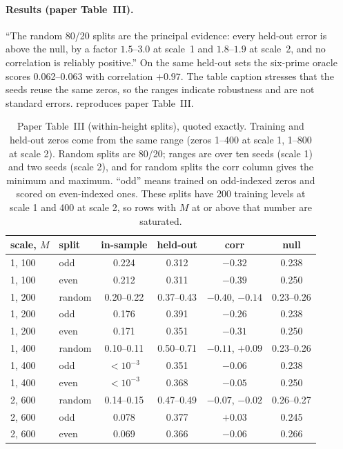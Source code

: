 \paragraph{Results (paper Table~III).} ``The random 80/20 splits are the principal evidence: every held-out error is above the null, by a factor $1.5$--$3.0$ at scale~1 and $1.8$--$1.9$ at scale~2, and no correlation is reliably positive.'' On the same held-out sets the six-prime oracle scores 0.062--0.063 with correlation $+0.97$. The table caption stresses that the seeds reuse the same zeros, so the ranges indicate robustness and are not standard errors.  reproduces paper Table~III.

\begin{table}[htbp]\centering
\caption{Paper Table~III (within-height splits), quoted exactly. Training and held-out zeros come from the same range (zeros 1--400 at scale 1, 1--800 at scale 2). Random splits are 80/20; ranges are over ten seeds (scale 1) and two seeds (scale 2), and for random splits the corr column gives the minimum and maximum. ``odd'' means trained on odd-indexed zeros and scored on even-indexed ones. These splits have 200 training levels at scale 1 and 400 at scale 2, so rows with $M$ at or above that number are saturated.}
\label{tab:paper-memorization-tableIII}
\footnotesize
\begin{tabular}{llcccc}
\toprule
scale, $M$ & split & in-sample & held-out & corr & null \\
\midrule
1, 100 & odd & 0.224 & 0.312 & $-0.32$ & 0.238 \\
1, 100 & even & 0.212 & 0.311 & $-0.39$ & 0.250 \\
1, 200 & random & 0.20--0.22 & 0.37--0.43 & $-0.40$, $-0.14$ & 0.23--0.26 \\
1, 200 & odd & 0.176 & 0.391 & $-0.26$ & 0.238 \\
1, 200 & even & 0.171 & 0.351 & $-0.31$ & 0.250 \\
1, 400 & random & 0.10--0.11 & 0.50--0.71 & $-0.11$, $+0.09$ & 0.23--0.26 \\
1, 400 & odd & $<10^{-3}$ & 0.351 & $-0.06$ & 0.238 \\
1, 400 & even & $<10^{-3}$ & 0.368 & $-0.05$ & 0.250 \\
2, 600 & random & 0.14--0.15 & 0.47--0.49 & $-0.07$, $-0.02$ & 0.26--0.27 \\
2, 600 & odd & 0.078 & 0.377 & $+0.03$ & 0.245 \\
2, 600 & even & 0.069 & 0.366 & $-0.06$ & 0.266 \\
\bottomrule
\end{tabular}
\end{table}

